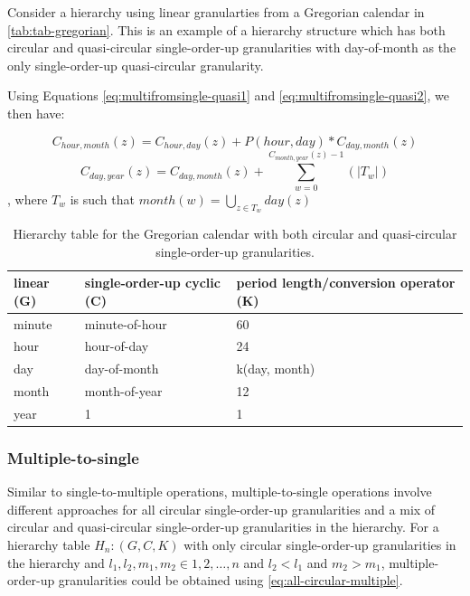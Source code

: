 \documentclass[12pt]{article}
\begin{document}
\noindent Consider a hierarchy using linear granularties from a Gregorian calendar in \autoref{tab:tab-gregorian}. This is an example of a hierarchy structure which has both circular and quasi-circular single-order-up granularities with day-of-month as the only single-order-up quasi-circular granularity.

\noindent Using Equations \ref{eq:multifromsingle-quasi1} and \ref{eq:multifromsingle-quasi2}, we then have:

\[C_{hour, month}(z) = C_{hour, day}(z) + P(hour, day)*C_{day, month}(z)\]
\[C_{day, year}(z) = C_{day,month}(z) + \sum_{w=0}^{C_{month, year}(z)-1}(\vert T_{w} \vert)\], where \(T_w\) is such that \(month(w) = \bigcup_{z \in T_w}day(z)\)

\begin{table}

\caption{\label{tab:tab-gregorian}Hierarchy table for the Gregorian calendar with both circular and quasi-circular single-order-up granularities.}
\centering
\begin{tabular}[t]{lll}
\toprule
linear (G) & single-order-up cyclic (C) & period length/conversion operator (K)\\
\midrule
minute & minute-of-hour & 60\\
hour & hour-of-day & 24\\
day & day-of-month & k(day, month)\\
month & month-of-year & 12\\
year & 1 & 1\\
\bottomrule
\end{tabular}
\end{table}

\hypertarget{sec:multiple-to-single}{%
\subsubsection{Multiple-to-single}\label{sec:multiple-to-single}}

\noindent Similar to single-to-multiple operations, multiple-to-single operations involve different approaches for all circular single-order-up granularities and a mix of circular and quasi-circular single-order-up granularities in the hierarchy. For a hierarchy table \(H_n: (G, C, K)\) with only circular single-order-up granularities in the hierarchy and \(l_1, l_2, m_1, m_2 \in {1, 2, \dots, n}\) and \(l_2<l_1\) and \(m_2>m_1\), multiple-order-up granularities could be obtained using \ref{eq:all-circular-multiple}.
\end{document}

